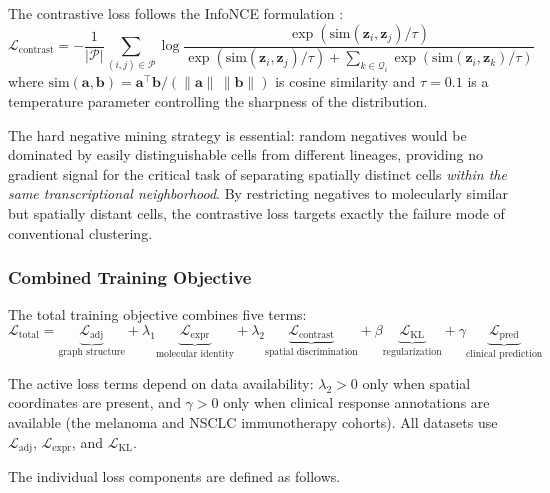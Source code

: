 \documentclass{article}
\newcommand{\KL}{\mathrm{KL}}
\begin{document}
The contrastive loss follows the InfoNCE formulation \cite{oord2018representation}:
\begin{equation}
    \mathcal{L}_{\text{contrast}} = -\frac{1}{|\mathcal{P}|} \sum_{(i,j) \in \mathcal{P}} \log \frac{\exp\!\left(\text{sim}(\mathbf{z}_i, \mathbf{z}_j) / \tau\right)}{\exp\!\left(\text{sim}(\mathbf{z}_i, \mathbf{z}_j) / \tau\right) + \displaystyle\sum_{k \in \mathcal{Q}_i} \exp\!\left(\text{sim}(\mathbf{z}_i, \mathbf{z}_k) / \tau\right)}
    \label{eq:contrastive}
\end{equation}
where $\text{sim}(\mathbf{a}, \mathbf{b}) = \mathbf{a}^\top \mathbf{b} / (\|\mathbf{a}\| \, \|\mathbf{b}\|)$ is cosine similarity and $\tau = 0.1$ is a temperature parameter controlling the sharpness of the distribution.

The hard negative mining strategy is essential: random negatives would be dominated by easily distinguishable cells from different lineages, providing no gradient signal for the critical task of separating spatially distinct cells \textit{within the same transcriptional neighborhood}. By restricting negatives to molecularly similar but spatially distant cells, the contrastive loss targets exactly the failure mode of conventional clustering.


\subsubsection{Combined Training Objective}

The total training objective combines five terms:
\begin{equation}
    \mathcal{L}_{\text{total}} = \underbrace{\mathcal{L}_{\text{adj}}}_{\text{graph structure}} + \lambda_1 \underbrace{\mathcal{L}_{\text{expr}}}_{\text{molecular identity}} + \lambda_2 \underbrace{\mathcal{L}_{\text{contrast}}}_{\text{spatial discrimination}} + \beta \underbrace{\mathcal{L}_{\KL}}_{\text{regularization}} + \gamma \underbrace{\mathcal{L}_{\text{pred}}}_{\text{clinical prediction}}
    \label{eq:total_loss}
\end{equation}

The active loss terms depend on data availability: $\lambda_2 > 0$ only when spatial coordinates are present, and $\gamma > 0$ only when clinical response annotations are available (the melanoma and NSCLC immunotherapy cohorts). All datasets use $\mathcal{L}_{\text{adj}}$, $\mathcal{L}_{\text{expr}}$, and $\mathcal{L}_{\KL}$.

The individual loss components are defined as follows.
\end{document}
